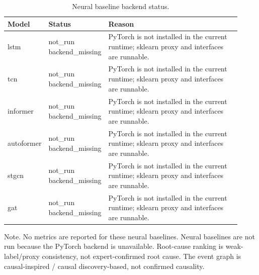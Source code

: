 \begin{table}[t]
\centering
\caption{Neural baseline backend status.}
\label{tab:model_status}
\scriptsize
\begin{tabular}{p{0.14\linewidth}p{0.20\linewidth}p{0.58\linewidth}}
\toprule
Model & Status & Reason \\
\midrule
lstm & \makecell[l]{not\_run\\backend\_missing} & PyTorch is not installed in the current runtime; sklearn proxy and interfaces are runnable. \\
tcn & \makecell[l]{not\_run\\backend\_missing} & PyTorch is not installed in the current runtime; sklearn proxy and interfaces are runnable. \\
informer & \makecell[l]{not\_run\\backend\_missing} & PyTorch is not installed in the current runtime; sklearn proxy and interfaces are runnable. \\
autoformer & \makecell[l]{not\_run\\backend\_missing} & PyTorch is not installed in the current runtime; sklearn proxy and interfaces are runnable. \\
stgcn & \makecell[l]{not\_run\\backend\_missing} & PyTorch is not installed in the current runtime; sklearn proxy and interfaces are runnable. \\
gat & \makecell[l]{not\_run\\backend\_missing} & PyTorch is not installed in the current runtime; sklearn proxy and interfaces are runnable. \\
\bottomrule
\end{tabular}

\vspace{0.3em}
\footnotesize{Note. No metrics are reported for these neural baselines. Neural baselines are not run because the PyTorch backend is unavailable. Root-cause ranking is weak-label/proxy consistency, not expert-confirmed root cause. The event graph is causal-inspired / causal discovery-based, not confirmed causality.}
\end{table}
